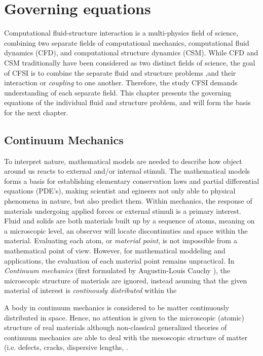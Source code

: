 \chapter{Governing equations}

Computational fluid-structure interaction is a multi-physics field of science, combining two separate fields of computational mechanics, computational fluid dynamics (CFD), and computational structure dynamics (CSM). While CFD and CSM traditionally have been considered as two distinct fields of science,  the goal of CFSI is to combine the separate fluid and structure problems ,and their interaction or \textit{coupling} to one another. Therefore, the study CFSI demands understanding of each separate field. This chapter presents the governing equations of the individual fluid and structure problem, and will form the basis for the next chapter.



\section{Continuum Mechanics}
To interpret nature, mathematical models are needed to describe how object around us reacts to external and/or internal stimuli. 
The mathematical models forms a basis for establishing elementary conservation laws and partial differential equations (PDE's), making scientist and egineers not only able to physical phenomena  in nature, but also predict them. Within mechanics, the response of materials undergoing applied forces or external stimuli is a primary interest. 
Fluid and solids are both materials built up by a sequence of atoms, meaning on a microscopic level, an observer will locate discontinuties and space within the material. Evaluating each atom, or \textit{material point}, is not impossible from a mathematical point of view. However, for mathematical moddeling and applications, the evaluation of each material point remains unpractical. In \textit{Continuum mechanics} (first formulated by Augustin-Louis Cauchy \cite{Merodio2011}), the microscopic structure of materials are  ignored, instead  asuming that the given material of interest is \textit{continously distributed} within the

 A body in continuum mechanics is considered to be matter continuously distributed in space.  Hence, no attention is given to the microscopic (atomic) structure of real materials although non-classical generalized theories of continuum mechanics are able to deal with the mesoscopic structure of matter (i.e. defects, cracks, dispersive lengths, .

